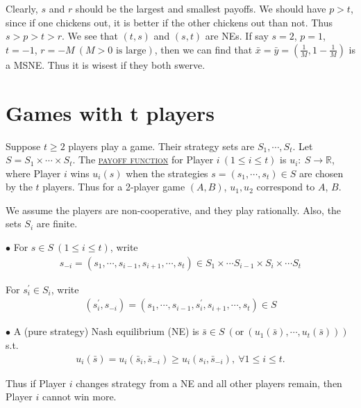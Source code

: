 \begin{example}
    Clearly, $s$ and $r$ should be the largest and smallest payoffs. We should have $p>t$, since if one chickens out, it is better if the other chickens out than not. Thus $s>p>t>r$. We see that $(t, s)$ and $(s, t)$ are NEs. If say $s = 2$, $p = 1$, $t = -1$, $r = -M\ (M>0\text{ is large})$, then we can find that $\bar{x} = \bar{y} = \left( \frac{1}{M}, 1-\frac{1}{M}\right)$ is a MSNE. Thus it is wisest if they both swerve. 
\end{example}

\section{Games with t players}
Suppose $t\geqslant 2$ players play a game. Their strategy sets are $S_1, \cdots, S_t$. Let $S = S_1\times\cdots\times S_t$. The \uline{\textcolor{MarkerColour}{\textsc{payoff function}}} for Player $i\ (1\leqslant i\leqslant t)$ is $u_i:\ S\to\mathbb{R}$, where Player $i$ wins $u_i(s)$ when the strategies $s = (s_1,\cdots, s_t)\in S$ are chosen by the $t$ players. Thus for a 2-player game $(A, B)$, $u_1, u_2$ correspond to $A$, $B$.

We assume the players are non-cooperative, and they play rationally. Also, the sets $S_i$ are finite.
\begin{definition}
    $\bullet$ For $s\in S\ (1\leqslant i\leqslant t)$, write
    \begin{align*}
        s_{-i} = (s_1, \cdots, s_{i-1}, s_{i+1}, \cdots, s_t)\in S_1\times\cdots S_{i-1}\times S_{i}\times \cdots S_t
    \end{align*}

    For $s^{\prime}_i\in S_i$, write 
    \begin{align*}
        (s_i^{\prime}, s_{-i}) = (s_1, \cdots, s_{i-1}, s_i^{\prime}, s_{i+1}, \cdots, s_{t})\in S
    \end{align*}

    $\bullet$ A (pure strategy) Nash equilibrium (NE) is $\bar{s} \in S\ (\text{or}\ (u_1(\bar{s}), \cdots, u_t(\bar{s})))$ s.t.
    \begin{align*}
        u_i(\bar{s}) = u_i(\bar{s}_i, \bar{s}_{-i}) \geqslant u_i(s_i, \bar{s}_{-i}), \ \forall 1\leqslant i\leqslant t.
    \end{align*}

    Thus if Player $i$ changes strategy from a NE and all other players remain, then Player $i$ cannot win more.
\end{definition}

